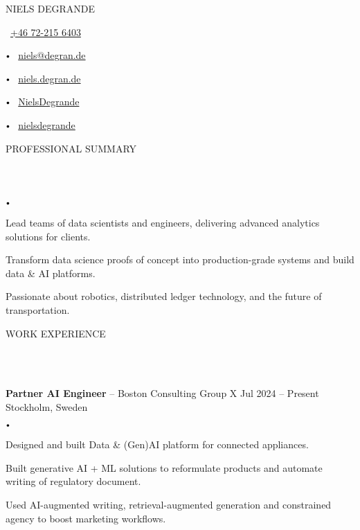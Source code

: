 \documentclass{article}
\newcommand{\contact}[2]{
    \begin{center}
    {\LARGE \uppercase {#1}} \\
    \vspace{8pt}
    #2
    \end{center}
}
\newcommand{\header}[1]{
    {
        \hspace*{-4pt}
        \vspace*{8pt}
        \uppercase{#1}
    }
    \vspace*{-4pt} 
    \lineunder
    \vspace*{8pt}
}
\newcommand{\lineunder}{
    \vspace*{-8pt} \\ 
    \hspace*{-4pt} 
    \hrulefill \\
}
\newcommand{\experience}[5]{
    \vspace*{2pt}
    \textbf{#1} -- #2 \hfill #3 \\ 
    #4 \\
    #5
    \vspace*{2pt}
}
\newcommand{\bigdot}{
    $\vcenter{\hbox{\tiny$\bullet$}}$\hspace*{2pt}
}
\newcommand{\spacedbullet}{
    $\vcenter{\hbox{\tiny$\bullet$}}$\hspace*{-2pt}
}
\newenvironment{bulletlist}{
    \begin{list}
        {\spacedbullet}{\setlength\leftmargin{10pt} 
        \topsep 0pt \itemsep -2pt}}{\vspace*{4pt}
    \end{list}
}
\begin{document}
\small

\vspace*{-32pt}

\contact{Niels Degrande}
{
    \faPhone\ \href{tel:+46722156403}{+46 72-215 6403}
    \bigdot \faEnvelope\ \href{mailto:niels@degran.de}{niels@degran.de}
    \bigdot \faGlobe\ \href{https://niels.degran.de}{niels.degran.de}
    \bigdot \faGithub\ \href{https://github.com/NielsDegrande}{NielsDegrande}
    \bigdot \faLinkedin\ \href{https://linkedin.com/in/nielsdegrande}{nielsdegrande}
}

\vspace{16pt}

\header{Professional Summary}
\begin{bulletlist}
    \item Lead teams of data scientists and engineers, delivering advanced analytics solutions for clients.
    \item Transform data science proofs of concept into production-grade systems and build data \& AI platforms.
    \item Passionate about robotics, distributed ledger technology, and the future of transportation.
\end{bulletlist}

\vspace*{4pt}

\header{Work Experience}
\experience{Partner AI Engineer}{Boston Consulting Group X}{Jul 2024 -- Present}{Stockholm, Sweden}
{
    \begin{bulletlist}
        \item Designed and built Data \& (Gen)AI platform for connected appliances.
        \item Built generative AI + ML solutions to reformulate products and automate writing of regulatory document.
        \item Used AI-augmented writing, retrieval-augmented generation and constrained agency to boost marketing workflows.
    \end{bulletlist}
}
\end{document}
